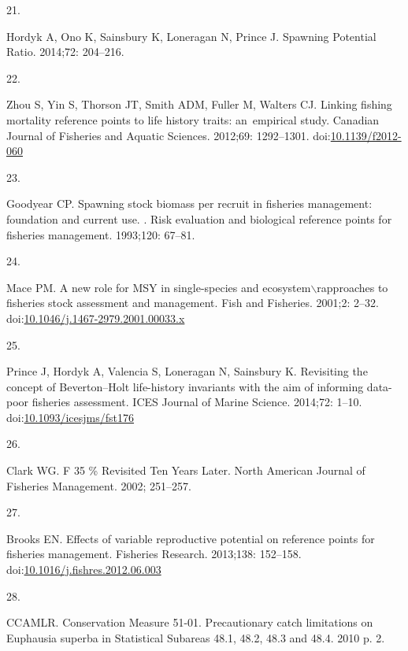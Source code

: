 \documentclass[
]{article}
\newlength{\cslhangindent}
\newlength{\csllabelwidth}
\newlength{\cslentryspacingunit} %
\newenvironment{CSLReferences}[2] %
 {%
  \setlength{\parindent}{0pt}
  \ifodd #1
  \let\oldpar\par
  \def\par{\hangindent=\cslhangindent\oldpar}
  \fi
  \setlength{\parskip}{#2\cslentryspacingunit}
 }%
 {}
\newcommand{\CSLLeftMargin}[1]{\parbox[t]{\csllabelwidth}{#1}}
\newcommand{\CSLRightInline}[1]{\parbox[t]{\linewidth - \csllabelwidth}{#1}\break}
\begin{document}
\begin{CSLReferences}{0}{0}
\leavevmode{}%
\CSLLeftMargin{21. }%
\CSLRightInline{Hordyk A, Ono K, Sainsbury K, Loneragan N, Prince J.
{Spawning Potential Ratio}. 2014;72: 204--216. }

\leavevmode{}%
\CSLLeftMargin{22. }%
\CSLRightInline{Zhou S, Yin S, Thorson JT, Smith ADM, Fuller M, Walters
CJ. {Linking fishing mortality reference points to life history traits:
an~empirical study}. Canadian Journal of Fisheries and Aquatic Sciences.
2012;69: 1292--1301.
doi:\href{https://doi.org/10.1139/f2012-060}{10.1139/f2012-060}}

\leavevmode{}%
\CSLLeftMargin{23. }%
\CSLRightInline{Goodyear CP. {Spawning stock biomass per recruit in
fisheries management: foundation and current use. }. Risk evaluation and
biological reference points for fisheries management. 1993;120: 67--81.
}

\leavevmode{}%
\CSLLeftMargin{24. }%
\CSLRightInline{Mace PM. {A new role for MSY in single-species and
ecosystem\(\backslash\)rapproaches to fisheries stock assessment and
management}. Fish and Fisheries. 2001;2: 2--32.
doi:\href{https://doi.org/10.1046/j.1467-2979.2001.00033.x}{10.1046/j.1467-2979.2001.00033.x}}

\leavevmode{}%
\CSLLeftMargin{25. }%
\CSLRightInline{Prince J, Hordyk A, Valencia S, Loneragan N, Sainsbury
K. {Revisiting the concept of Beverton--Holt life-history invariants
with the aim of informing data-poor fisheries assessment}. ICES Journal
of Marine Science. 2014;72: 1--10.
doi:\href{https://doi.org/10.1093/icesjms/fst176}{10.1093/icesjms/fst176}}

\leavevmode{}%
\CSLLeftMargin{26. }%
\CSLRightInline{Clark WG. {F 35 {\%} Revisited Ten Years Later}. North
American Journal of Fisheries Management. 2002; 251--257. }

\leavevmode{}%
\CSLLeftMargin{27. }%
\CSLRightInline{Brooks EN. {Effects of variable reproductive potential
on reference points for fisheries management}. Fisheries Research.
2013;138: 152--158.
doi:\href{https://doi.org/10.1016/j.fishres.2012.06.003}{10.1016/j.fishres.2012.06.003}}

\leavevmode{}%
\CSLLeftMargin{28. }%
\CSLRightInline{CCAMLR. {Conservation Measure 51-01. Precautionary catch
limitations on Euphausia superba in Statistical Subareas 48.1, 48.2,
48.3 and 48.4}. 2010 p. 2. }


\end{CSLReferences}
\end{document}
